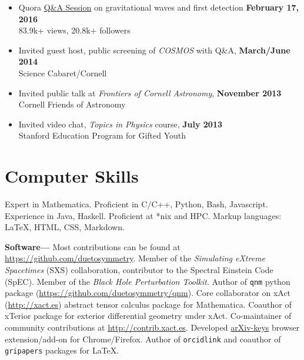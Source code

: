 \documentclass[margin,line]{res}
\begin{document}
\begin{resume}
\begin{itemize}
\item[] Quora \href{https://www.quora.com/session/Leo-C-Stein/1}{Q\&A Session} on gravitational waves and first detection
  \hfill {\bf February 17, 2016} \\
\hspace*{1em} 83.9k+ views, 20.8k+ followers \\

\item[] Invited guest host, public screening of {\it COSMOS} with Q\&A,
  \hfill {\bf March/June 2014} \\
\hspace*{1em} Science Cabaret/Cornell
\item[] Invited public talk at {\it Frontiers of Cornell Astronomy}, \hfill {\bf November 2013} \\
\hspace*{1em} Cornell Friends of Astronomy
\item[] Invited video chat, {\it Topics in Physics} course, \hfill {\bf July 2013} \\
\hspace*{1em} Stanford Education Program for Gifted Youth
\end{itemize}

\section{\sc Computer Skills}
Expert in {\sc Mathematica}.
Proficient in C/C++, Python, Bash, Javascript.
Experience in Java, Haskell.
Proficient at *nix and HPC.
Markup languages: \LaTeX, HTML, CSS, Markdown.


{\bf Software---}%
Most contributions can be found at \url{https://github.com/duetosymmetry}.
Member of the {\it Simulating eXtreme Spacetimes} (SXS) collaboration,
contributor to the Spectral Einstein Code (SpEC).
Member of the {\it Black Hole Perturbation Toolkit}. Author of
{\tt qnm} python package (\url{https://github.com/duetosymmetry/qnm}).
Core collaborator on {\sc xAct} (\url{http://xact.es}) abstract
tensor calculus package for {\sc  Mathematica}. Coauthor
of {\sc xTerior} package for exterior differential geometry under
{\sc xAct}. Co-maintainer of community contributions at
\url{http://contrib.xact.es}. Developed
\href{https://chrome.google.com/webstore/detail/arxiv-keys/fkjjdlbhliopfhgddlpoggpmpgjfaojd}{arXiv-keys}
browser extension/add-on for Chrome/Firefox.
Author of {\tt orcidlink} and coauthor of {\tt gripapers} packages for \LaTeX.


\end{resume}
\end{document}
